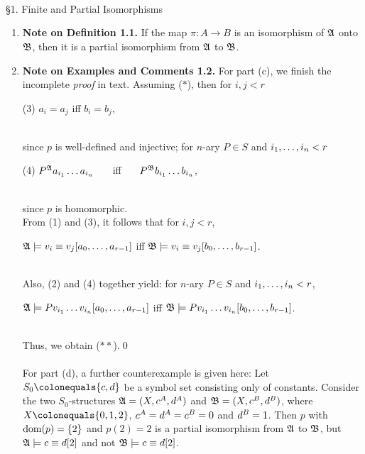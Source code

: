 \\
\\
\\
{\large \S1. Finite and Partial Isomorphisms}
\begin{enumerate}[1.]
%
\item \textbf{Note on Definition 1.1.} If the map $\pi : A \to B$ is an isomorphism of $\struct{A}$ onto $\struct{B}$, then it is a partial isomorphism from $\struct{A}$ to $\struct{B}$.
%
\item \textbf{Note on Examples and Comments 1.2.} For part (c), we finish the incomplete \emph{proof} in text. Assuming ($\ast$), then for $i, j < r$\smallskip\\
\begin{quoteno}{(3)}
$a_i = a_j$ \quad iff \quad $b_i = b_j$,
\end{quoteno}\smallskip\\
since $p$ is well-defined and injective; for $n$-ary $P \in S$ and $\seq[1]{i}{n} < r$\smallskip\\
\begin{quoteno}{(4)}
$P^\struct{A} \enum[i_1]{a}{i_n}$ \ \ \ iff \ \ \ $P^\struct{B} \enum[i_1]{b}{i_n}$,
\end{quoteno}\smallskip\\
since $p$ is homomorphic.\bigskip\\
From (1) and (3), it follows that for $i, j < r$,\\
\centerline{$\struct{A} \models v_i \equal v_j [\seq{a}{r - 1}]$ \quad iff \quad $\struct{B} \models v_i \equal v_j [\seq{b}{r - 1}]$.}\\
Also, (2) and (4) together yield: for $n$-ary $P \in S$ and $\seq[1]{i}{n} < r$,\\
\centerline{$\struct{A} \models P \enum[i_1]{v}{i_n} [\seq{a}{r - 1}]$ \quad iff \quad $\struct{B} \models P \enum[i_1]{v}{i_n} [\seq{b}{r - 1}]$.}\\
Thus, we obtain ($\ast\ast$).\qed\\
\ \\
For part (d), a further counterexample is given here: Let $S_0 \defas \setenum{c, d}$ be a symbol set consisting only of constants. Consider the two $S_0$-structures $\struct{A} = \tuple{X, \intpted{c}{A}, \intpted{d}{A}}$ and $\struct{B} = \tuple{X, \intpted{c}{B}, \intpted{d}{B}}$, where $X \defas \setenum{0, 1, 2}$, $\intpted{c}{A} = \intpted{d}{A} = \intpted{c}{B} = 0$ and $\intpted{d}{B} = 1$. Then $p$ with $\dom{p} = \setenum{2}$ and $p(2) = 2$ is a partial isomorphism from $\struct{A}$ to $\struct{B}$, but $\struct{A} \models c \equal d [2]$ and not $\struct{B} \models c \equal d [2]$.\\

\end{enumerate}
